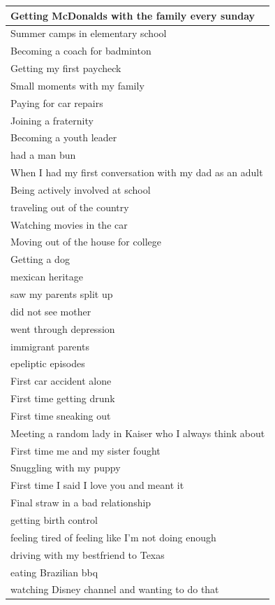 \documentclass[
  .7em,
  letterpaper,
  DIV=11,
  numbers=noendperiod]{scrartcl}
\begin{document}
\begin{table}
\begin{tabular}{l}
Getting McDonalds with the family every sunday\\
\hline
Summer camps in elementary school\\
\hline
Becoming a coach for badminton\\
\hline
Getting my first paycheck\\
\hline
Small moments with my family\\
\hline
Paying for car repairs\\
\hline
Joining a fraternity\\
\hline
Becoming a youth leader\\
\hline
had a man bun\\
\hline
When I had my first conversation with my dad as an adult\\
\hline
Being actively involved at school\\
\hline
traveling out of the country\\
\hline
Watching movies in the car\\
\hline
Moving out of the house for college\\
\hline
Getting a dog\\
\hline
mexican heritage\\
\hline
saw my parents split up\\
\hline
did not see mother\\
\hline
went through depression\\
\hline
immigrant parents\\
\hline
epeliptic episodes\\
\hline
First car accident alone\\
\hline
First time getting drunk\\
\hline
First time sneaking out\\
\hline
Meeting a random lady in Kaiser who I always think about\\
\hline
First time me and my sister fought\\
\hline
Snuggling with my puppy\\
\hline
First time I said I love you and meant it\\
\hline
Final straw in a bad relationship\\
\hline
getting birth control\\
\hline
feeling tired of feeling like I'm not doing enough\\
\hline
driving with my bestfriend to Texas\\
\hline
eating Brazilian bbq\\
\hline
watching Disney channel and wanting to do that\\

\end{tabular}
\end{table}
\end{document}
